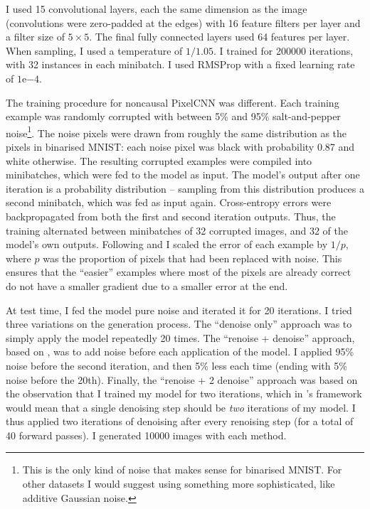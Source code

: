 \documentclass[11pt, a4paper, openany]{book}
\newcommand{\nquote}[1]{``{#1}''}
\begin{document}
I used 15 convolutional layers, each the same dimension as the image (convolutions were zero-padded at the edges) with 16 feature filters per layer and a filter size of $5\times 5$. The final fully connected layers used 64 features per layer. When sampling, I used a temperature of $1/1.05$. I trained for 200000 iterations, with 32 instances in each minibatch. I used RMSProp with a fixed learning rate of $1\mathrm{e}{-4}$.

The training procedure for noncausal PixelCNN was different. Each training example was randomly corrupted with between 5\% and 95\% salt-and-pepper noise\footnote{This is the only kind of noise that makes sense for binarised MNIST. For other datasets I would suggest using something more sophisticated, like additive Gaussian noise.}. The noise pixels were drawn from roughly the same distribution as the pixels in binarised MNIST: each noise pixel was black with probability 0.87 and white otherwise. The resulting corrupted examples were compiled into minibatches, which were fed to the model as input. The model's output after one iteration is a probability distribution -- sampling from this distribution produces a second minibatch, which was fed as input again. Cross-entropy errors were backpropagated from both the first and second iteration outputs. Thus, the training alternated between minibatches of 32 corrupted images, and 32 of the model's own outputs. Following \citet{dnade} and \citet{infusion} I scaled the error of each example by $1/p$, where $p$ was the proportion of pixels that had been replaced with noise. This ensures that the \nquote{easier} examples where most of the pixels are already correct do not have a smaller gradient due to a smaller error at the end.

At test time, I fed the model pure noise and iterated it for 20 iterations. I tried three variations on the generation process. The \nquote{denoise only} approach was to simply apply the model repeatedly 20 times. The \nquote{renoise + denoise} approach, based on \citet{gsnnade}, was to add noise before each application of the model. I applied 95\% noise before the second iteration, and then 5\% less each time (ending with 5\% noise before the 20th). Finally, the \nquote{renoise + 2 denoise} approach was based on the observation that I trained my model for two iterations, which in \citet{gsnnade}'s framework would mean that a single denoising step should be \emph{two} iterations of my model. I thus applied two iterations of denoising after every renoising step (for a total of 40 forward passes). I generated 10000 images with each method.
\end{document}
